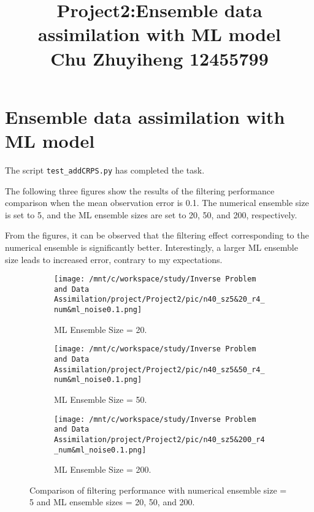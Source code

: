 \documentclass[11pt,reqno]{amsart}
\begin{document}
\title[]{Project2:Ensemble data assimilation with ML model\\Chu Zhuyiheng 12455799}
\maketitle


\section{Ensemble data assimilation with ML model}

The script \verb|test_addCRPS.py| has completed the task.

The following three figures show the results of the filtering performance comparison when the mean observation error is 0.1. The numerical ensemble size is set to 5, and the ML ensemble sizes are set to 20, 50, and 200, respectively. 

From the figures, it can be observed that the filtering effect corresponding to the numerical ensemble is significantly better. Interestingly, a larger ML ensemble size leads to increased error, contrary to my expectations.

\begin{figure}[h]
  \centering
  \begin{subfigure}[t]{0.65\textwidth}
      \centering
      \texttt{[image: /mnt/c/workspace/study/Inverse Problem and Data Assimilation/project/Project2/pic/n40\_sz5\&20\_r4\_num\&ml\_noise0.1.png]} %
      \caption{ML Ensemble Size = 20.}
      \label{fig:ml-ensemble-20}
  \end{subfigure}
  \vspace{0.5cm}
  
  \begin{subfigure}[t]{0.65\textwidth}
      \centering
      \texttt{[image: /mnt/c/workspace/study/Inverse Problem and Data Assimilation/project/Project2/pic/n40\_sz5\&50\_r4\_num\&ml\_noise0.1.png]} %
      \caption{ML Ensemble Size = 50.}
      \label{fig:ml-ensemble-50}
  \end{subfigure}
  \vspace{0.5cm}
  
  \begin{subfigure}[t]{0.65\textwidth}
      \centering
      \texttt{[image: /mnt/c/workspace/study/Inverse Problem and Data Assimilation/project/Project2/pic/n40\_sz5\&200\_r4\_num\&ml\_noise0.1.png]} %
      \caption{ML Ensemble Size = 200.}
      \label{fig:ml-ensemble-200}
  \end{subfigure}

  \caption{Comparison of filtering performance with numerical ensemble size = 5 and ML ensemble sizes = 20, 50, and 200.}
  \label{fig:ensemble-comparison}
\end{figure}
\end{document}
